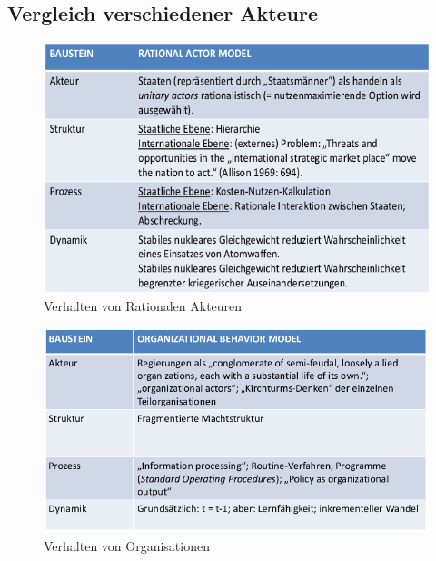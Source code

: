 \documentclass[a4paper, 11pt]{article}
\begin{document}
\subsection{Vergleich verschiedener Akteure}

\newpage


\begin{figure}[htb!]
	\centering
	\includegraphics[keepaspectratio=true,height=15\baselineskip]{rationalactor.png}
	\caption{Verhalten von Rationalen Akteuren}
	\label{fig:rationalactors}
\end{figure}

\begin{figure}[htb!]
	\centering
	\includegraphics[keepaspectratio=true,height=15\baselineskip]{organizationalactor.png}
	\caption{Verhalten von Organisationen}
	\label{fig:organizationalactors}
\end{figure}
\end{document}
